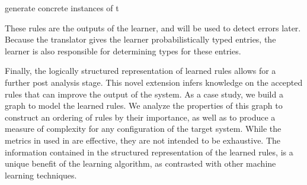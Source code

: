 generate concrete instances of t



These rules are the outputs of the learner, 
and will be used to detect errors later.
Because the translator gives the learner probabilistically typed entries,
the learner is also responsible for determining types for these entries.

Finally, the logically structured representation of learned rules allows for a further post analysis stage.
This novel extension infers knowledge on the accepted rules that can improve the output of the system.
As a case study, we build a graph to model the learned rules.
We analyze the properties of this graph to construct an ordering of rules by their importance, 
  as well as to produce a measure of complexity for any configuration of the target system.
While the metrics in used in \app are effective, they are not intended to be exhaustive.
The information contained in the structured representation of the learned rules, 
  is a unique benefit of the learning algorithm, as contrasted with other machine learning techniques.


